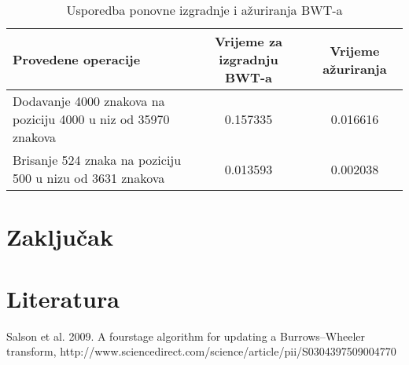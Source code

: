 \documentclass{ferseminar}
\begin{document}
\begin{table}[h]
\begin{tabular}{|m{5cm}|c|c|}
	\hline
	Provedene operacije & Vrijeme za izgradnju BWT-a & Vrijeme ažuriranja \\
	\hline
	Dodavanje 4000 znakova na poziciju 4000 u niz od 35970 znakova & 0.157335 & 0.016616 \\
	\hline
	Brisanje 524 znaka na poziciju 500 u nizu od 3631 znakova & 0.013593 & 0.002038 \\
	\hline
\end{tabular}
\caption{Usporedba ponovne izgradnje i ažuriranja BWT-a}
\label{tablica:usporedba}
\end{table}

\section{Zaključak}



\section{Literatura}
Salson et al. 2009. A fourstage algorithm for updating a Burrows–Wheeler transform,
http://www.sciencedirect.com/science/article/pii/S0304397509004770
\end{document}

